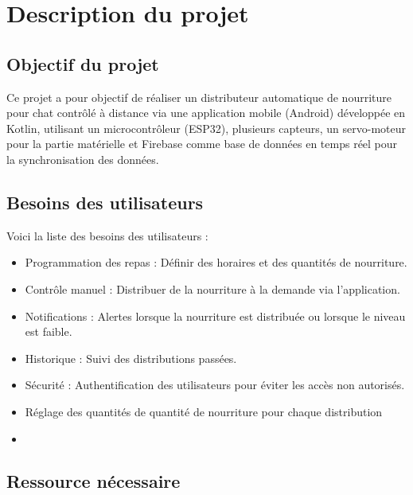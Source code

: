\chapter*{Description du projet}
\section{Objectif du projet}
	 Ce projet a pour objectif de réaliser un distributeur automatique de nourriture pour chat contrôlé à distance via une application mobile (Android) développée en Kotlin, utilisant un microcontrôleur (ESP32), plusieurs capteurs, un servo-moteur pour la partie matérielle et Firebase comme base de données en temps réel pour la synchronisation des données.

\section{Besoins des utilisateurs}

Voici la liste des besoins des utilisateurs :

\begin{itemize}
\item     Programmation des repas : Définir des horaires et des quantités de nourriture.

\item     Contrôle manuel : Distribuer de la nourriture à la demande via l'application.

\item     Notifications : Alertes lorsque la nourriture est distribuée ou lorsque le niveau est faible.

\item     Historique : Suivi des distributions passées.

\item     Sécurité : Authentification des utilisateurs pour éviter les accès non autorisés.

\item  Réglage des quantités de quantité de nourriture pour chaque distribution

\item 
\end{itemize}
    
\section{Ressource nécessaire}

\setcounter{page}{1}       





